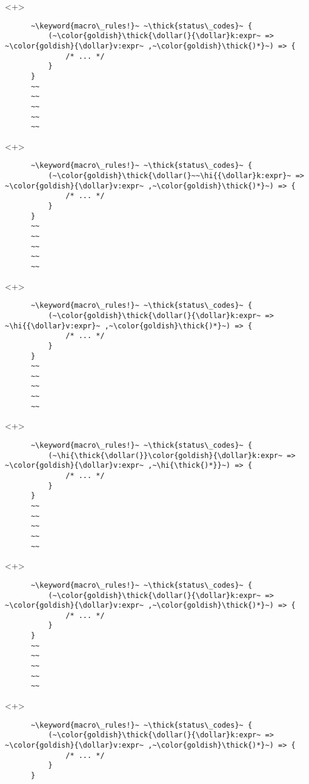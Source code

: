 \documentclass[usepdftitle=false,aspectratio=169]{beamer}
\newcommand{\dollar}{\makebox[\widthof{\$}][c]{\$}}
\newcommand{\thick}[1]{\contourlength{0.16pt}\contour[10]{black}{#1}}
\newcommand{\hi}[1]{%
\tikz[baseline=(A.base)]
 \node[highlighting=yellowbg,inner sep=0pt,text depth=0pt] (A) {#1};%
}
\newcommand{\keyword}[1]{\color{greenish}#1}
\begin{document}
\begin{frame}[fragile]
  \begin{onlyenv}<+>
    \begin{verbatim}
      ~\keyword{macro\_rules!}~ ~\thick{status\_codes}~ {
          (~\color{goldish}\thick{\dollar(}{\dollar}k:expr~ => ~\color{goldish}{\dollar}v:expr~ ,~\color{goldish}\thick{)*}~) => {
              /* ... */
          }
      }
      ~~
      ~~
      ~~
      ~~
      ~~
    \end{verbatim}
  \end{onlyenv}
  \begin{onlyenv}<+>
    \begin{verbatim}
      ~\keyword{macro\_rules!}~ ~\thick{status\_codes}~ {
          (~\color{goldish}\thick{\dollar(}~~\hi{{\dollar}k:expr}~ => ~\color{goldish}{\dollar}v:expr~ ,~\color{goldish}\thick{)*}~) => {
              /* ... */
          }
      }
      ~~
      ~~
      ~~
      ~~
      ~~
    \end{verbatim}
  \end{onlyenv}
  \begin{onlyenv}<+>
    \begin{verbatim}
      ~\keyword{macro\_rules!}~ ~\thick{status\_codes}~ {
          (~\color{goldish}\thick{\dollar(}{\dollar}k:expr~ => ~\hi{{\dollar}v:expr}~ ,~\color{goldish}\thick{)*}~) => {
              /* ... */
          }
      }
      ~~
      ~~
      ~~
      ~~
      ~~
    \end{verbatim}
  \end{onlyenv}
  \begin{onlyenv}<+>
    \begin{verbatim}
      ~\keyword{macro\_rules!}~ ~\thick{status\_codes}~ {
          (~\hi{\thick{\dollar(}}\color{goldish}{\dollar}k:expr~ => ~\color{goldish}{\dollar}v:expr~ ,~\hi{\thick{)*}}~) => {
              /* ... */
          }
      }
      ~~
      ~~
      ~~
      ~~
      ~~
    \end{verbatim}
  \end{onlyenv}
  \begin{onlyenv}<+>
    \begin{verbatim}
      ~\keyword{macro\_rules!}~ ~\thick{status\_codes}~ {
          (~\color{goldish}\thick{\dollar(}{\dollar}k:expr~ => ~\color{goldish}{\dollar}v:expr~ ,~\color{goldish}\thick{)*}~) => {
              /* ... */
          }
      }
      ~~
      ~~
      ~~
      ~~
      ~~
    \end{verbatim}
  \end{onlyenv}
  \begin{onlyenv}<+>
    \begin{verbatim}
      ~\keyword{macro\_rules!}~ ~\thick{status\_codes}~ {
          (~\color{goldish}\thick{\dollar(}{\dollar}k:expr~ => ~\color{goldish}{\dollar}v:expr~ ,~\color{goldish}\thick{)*}~) => {
              /* ... */
          }
      }


\end{verbatim}
\end{onlyenv}
\end{frame}
\end{document}
